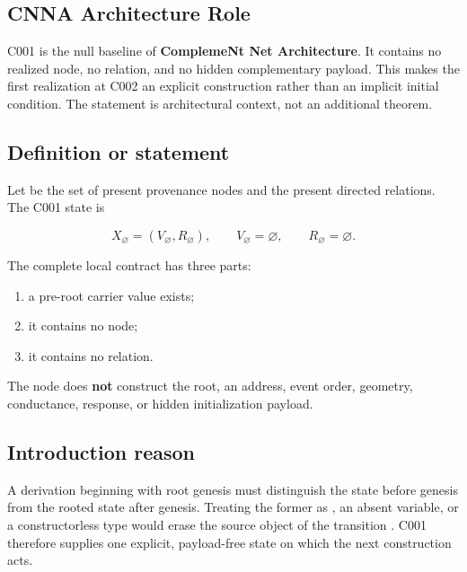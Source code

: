\subsection{CNNA Architecture Role}\label{cnna-architecture-role}

C001 is the null baseline of \textbf{ComplemeNt Net Architecture}. It
contains no realized node, no relation, and no hidden complementary
payload. This makes the first realization at C002 an explicit
construction rather than an implicit initial condition. The statement is
architectural context, not an additional theorem.

\subsection{Definition or statement}\label{definition-or-statement-2}

Let \texttt{\protect{}} be the set of present provenance nodes and
\texttt{\protect{}} the present directed relations. The C001 state is

\[
X_{\varnothing}=(V_{\varnothing},R_{\varnothing}),
\qquad
V_{\varnothing}=\varnothing,
\qquad
R_{\varnothing}=\varnothing.
\]

The complete local contract has three parts:

\begin{enumerate}
\def\labelenumi{\arabic{enumi}.}
\tightlist
\item
  a pre-root carrier value exists;
\item
  it contains no node;
\item
  it contains no relation.
\end{enumerate}

The node does \textbf{not} construct the root, an address, event order,
geometry, conductance, response, or hidden initialization payload.

\subsection{Introduction reason}\label{introduction-reason-2}

A derivation beginning with root genesis must distinguish the state
before genesis from the rooted state after genesis. Treating the former
as \texttt{\protect{}}, an absent variable, or a constructorless type would
erase the source object of the transition \texttt{\protect{}}. C001
therefore supplies one explicit, payload-free state on which the next
construction acts.

